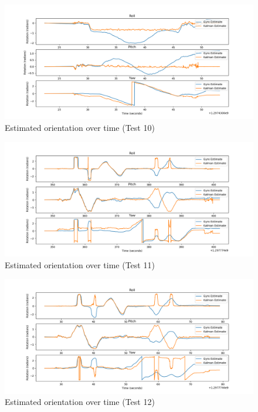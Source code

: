 \documentclass[a4paper]{article}
\begin{document}
\begin{figure}[h]
  \centering
    \includegraphics[width=1\textwidth]{rpy_testset10.png}
  \caption{Estimated orientation over time (Test 10)\label{fig:rpy_testset10}}
\end{figure}

\begin{figure}[h]
  \centering
    \includegraphics[width=1\textwidth]{rpy_testset11.png}
  \caption{Estimated orientation over time (Test 11)\label{fig:rpy_testset11}}
\end{figure}

\begin{figure}[h]
  \centering
    \includegraphics[width=1\textwidth]{rpy_testset12.png}
  \caption{Estimated orientation over time (Test 12)\label{fig:rpy_testset12}}
\end{figure}
\end{document}
